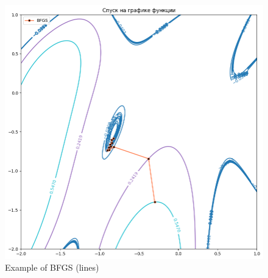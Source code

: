 \documentclass[12pt, a4paper, oneside, final]{article}
\begin{document}
	\begin{figure}[H]
		\centering
		\includegraphics[scale = 0.55]{Image/T2_BFGS_LINES_1.png}
		\caption*{Example of BFGS (lines)}
	\end{figure}
\end{document}
